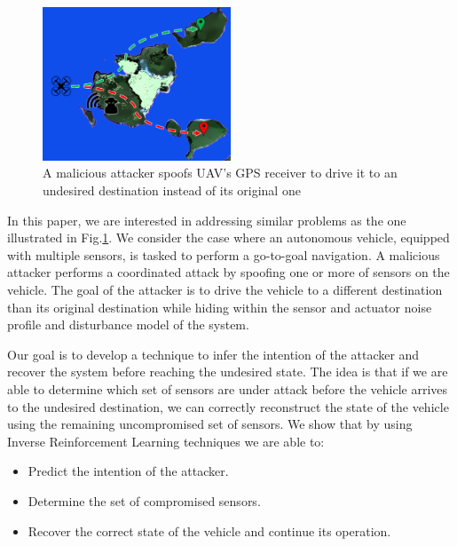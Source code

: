 \documentclass[letterpaper, 10 pt, conference]{ieeeconf}  %
\newcommand\NB[1]{$\spadesuit$\footnote{NB: #1}}
\begin{document}
\begin{figure}[t]
\centering
\includegraphics[width=0.5\textwidth]{problem}
\caption{A malicious attacker spoofs UAV's  GPS receiver to drive it to an undesired destination instead of its original one}
 \label{fig:problem}
\end{figure}

In this paper, we are interested in addressing similar problems as the one illustrated in Fig.\ref{fig:problem}. We consider the case where an autonomous vehicle, equipped with multiple sensors, is tasked to perform a go-to-goal navigation. 
A malicious attacker performs a coordinated attack by spoofing one or more of sensors on the vehicle. The goal of the attacker is to drive the vehicle to a different destination than its original destination while hiding within the sensor and actuator noise profile and disturbance model of the system. 

Our goal is to develop a technique to infer the intention of the attacker and recover the system before reaching the undesired state. 
The idea is that if we are able to determine which set of sensors are under attack before the vehicle arrives to the undesired destination, we can correctly reconstruct the state of the vehicle using the remaining uncompromised set of sensors.
We show that by using Inverse Reinforcement Learning techniques we are able to:
\begin{itemize}
    \item Predict the intention of the attacker.
    \item Determine the set of compromised sensors.
    \item Recover the correct state of the vehicle and continue its operation. 
\end{itemize}
\end{document}
